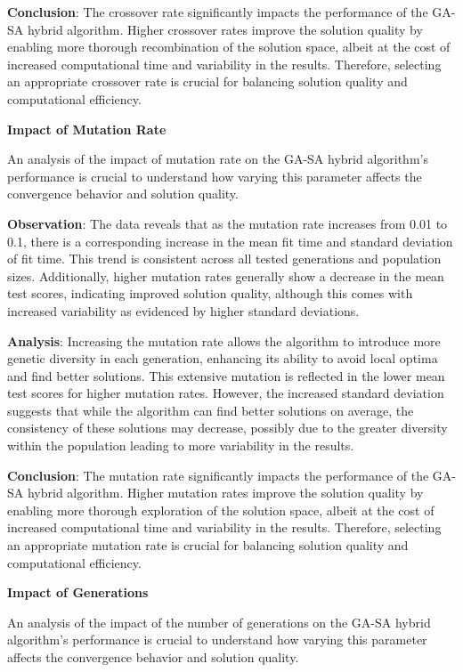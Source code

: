 \documentclass[
]{article}
\begin{document}
    \textbf{Conclusion}: The crossover rate significantly impacts the performance of the GA-SA hybrid algorithm. Higher crossover rates improve the solution quality by enabling more thorough recombination of the solution space, albeit at the cost of increased computational time and variability in the results. Therefore, selecting an appropriate crossover rate is crucial for balancing solution quality and computational efficiency.

    \textbf{Impact of Mutation Rate}

    An analysis of the impact of mutation rate on the GA-SA hybrid algorithm’s performance is crucial to understand how varying this parameter affects the convergence behavior and solution quality.

    \textbf{Observation}: The data reveals that as the mutation rate increases from 0.01 to 0.1, there is a corresponding increase in the mean fit time and standard deviation of fit time. This trend is consistent across all tested generations and population sizes. Additionally, higher mutation rates generally show a decrease in the mean test scores, indicating improved solution quality, although this comes with increased variability as evidenced by higher standard deviations.

    \textbf{Analysis}: Increasing the mutation rate allows the algorithm to introduce more genetic diversity in each generation, enhancing its ability to avoid local optima and find better solutions. This extensive mutation is reflected in the lower mean test scores for higher mutation rates. However, the increased standard deviation suggests that while the algorithm can find better solutions on average, the consistency of these solutions may decrease, possibly due to the greater diversity within the population leading to more variability in the results.

    \textbf{Conclusion}: The mutation rate significantly impacts the performance of the GA-SA hybrid algorithm. Higher mutation rates improve the solution quality by enabling more thorough exploration of the solution space, albeit at the cost of increased computational time and variability in the results. Therefore, selecting an appropriate mutation rate is crucial for balancing solution quality and computational efficiency.

    \textbf{Impact of Generations}

    An analysis of the impact of the number of generations on the GA-SA hybrid algorithm’s performance is crucial to understand how varying this parameter affects the convergence behavior and solution quality.
\end{document}
